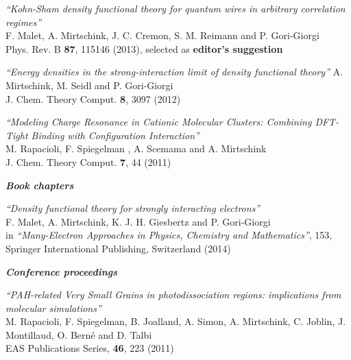 \documentclass[line,margin]{res}
\begin{document}
\begin{resume}
\begin{etaremune}
				\item {\sl ``Kohn-Sham density functional theory for quantum wires in arbitrary correlation regimes''}\\
					F. Malet, A. Mirtschink, J. C. Cremon, S. M. Reimann and P. Gori-Giorgi\\
					Phys. Rev. B \textbf{87}, 115146 (2013), selected as \textbf{editor's suggestion}
					
				\item {\sl ``Energy densities in the strong-interaction limit of density functional theory''}
					A. Mirtschink, M. Seidl and P. Gori-Giorgi\\
					J. Chem. Theory Comput. \textbf{8}, 3097 (2012)
					
				\item {\sl ``Modeling Charge Resonance in Cationic Molecular Clusters: Combining DFT-Tight Binding with Configuration Interaction''}\\
					M. Rapacioli, F. Spiegelman , A. Scemama and A. Mirtschink\\
					J. Chem. Theory Comput. \textbf{7}, 44 (2011)

               \end{etaremune}								

\textit{\textbf{Book chapters}}\smallskip

				\begin{etaremune}
				
				\item {\sl ``Density functional theory for strongly interacting electrons''}\\
				F. Malet, A. Mirtschink, K. J. H. Giesbertz and P. Gori-Giorgi\\
				in \textit{``Many-Electron Approaches in Physics, Chemistry and Mathematics''}, 153, Springer International Publishing, Switzerland (2014) 

               \end{etaremune}
               
               \textit{\textbf{Conference  proceedings}}\smallskip

				\begin{etaremune}
				
				\item  {\sl ``PAH-related Very Small Grains in photodissociation regions: implications from molecular simulations''}\\
					M. Rapacioli, F. Spiegelman, B. Joalland, A. Simon, A. Mirtschink, C. Joblin, J. Montillaud, O. Berné and D. Talbi\\ 
					 EAS Publications Series, \textbf{46}, 223 (2011)

               \end{etaremune}							
  
\end{resume}
\end{document}

